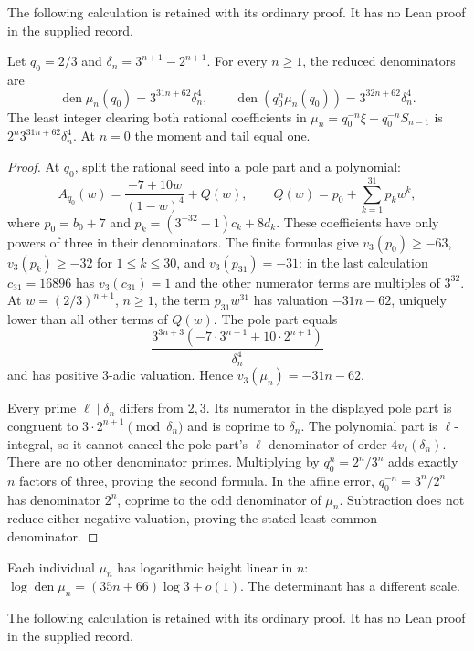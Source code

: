 \documentclass[11pt]{article}
\begin{document}
The following calculation is retained with its ordinary proof. It has
no Lean proof in the supplied record.

\begin{remark}
\label{long1049:thm:calibrated-denominators}
Let $q_0=2/3$ and $\delta_n=3^{n+1}-2^{n+1}$.  For every $n\ge1$,
the reduced denominators are
\[
 \operatorname{den}\mu_n(q_0)=3^{31n+62}\delta_n^4,
 \qquad
 \operatorname{den}(q_0^n\mu_n(q_0))=3^{32n+62}\delta_n^4.
\]
The least integer clearing both rational coefficients in
$\mu_n=q_0^{-n}\xi-q_0^{-n}S_{n-1}$ is
$2^n3^{31n+62}\delta_n^4$.  At $n=0$ the moment and tail equal one.
\end{remark}

\begin{proof}
At $q_0$, split the rational seed into a pole part and a polynomial:
\[
 A_{q_0}(w)=\frac{-7+10w}{(1-w)^4}+Q(w),\qquad
 Q(w)=p_0+\sum_{k=1}^{31}p_kw^k,
\]
where $p_0=b_0+7$ and
$p_k=(3^{-32}-1)c_k+8d_k$.  These coefficients have only powers
of three in their denominators.  The finite formulas give
$v_3(p_0)\ge-63$, $v_3(p_k)\ge-32$ for $1\le k\le30$, and
$v_3(p_{31})=-31$: in the last calculation $c_{31}=16896$ has
$v_3(c_{31})=1$ and the other numerator terms are multiples of
$3^{32}$.  At $w=(2/3)^{n+1}$, $n\ge1$, the term
$p_{31}w^{31}$ has valuation $-31n-62$, uniquely lower than all
other terms of $Q(w)$.  The pole part equals
\[
 \frac{3^{3n+3}(-7\cdot3^{n+1}+10\cdot2^{n+1})}{\delta_n^4}
\]
and has positive $3$-adic valuation.  Hence
$v_3(\mu_n)=-31n-62$.

Every prime $\ell\mid\delta_n$ differs from $2,3$.
Its numerator in the displayed pole part is congruent to
$3\cdot2^{n+1}\pmod{\delta_n}$ and is coprime to $\delta_n$.
The polynomial part is $\ell$-integral, so it cannot cancel the
pole part's $\ell$-denominator of order $4v_\ell(\delta_n)$.
There are no other denominator primes.  Multiplying by
$q_0^n=2^n/3^n$ adds exactly $n$ factors of three, proving the second
formula.  In the affine error, $q_0^{-n}=3^n/2^n$ has denominator
$2^n$, coprime to the odd denominator of $\mu_n$.  Subtraction does
not reduce either negative valuation, proving the stated least
common denominator.
\end{proof}

Each individual $\mu_n$ has logarithmic height linear in $n$:
$\log\operatorname{den}\mu_n=(35n+66)\log3+o(1)$.
The determinant has a different scale.

The following calculation is retained with its ordinary proof. It has
no Lean proof in the supplied record.
\end{document}
